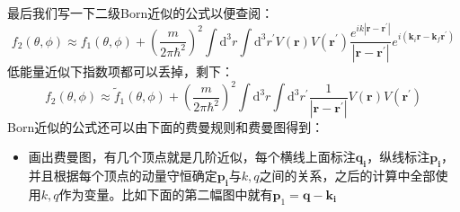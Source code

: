 \documentclass[a4paper,zihao=-4,linespread=1]{ctexrep}
\begin{document}
	最后我们写一下二级Born近似的公式以便查阅：
	\begin{equation}
		f_2(\theta,\phi)\approx f_1(\theta,\phi)+\left(\frac{m}{2\pi\hbar^2}\right)^2\int\mathrm{d}^3r\int\mathrm{d}^3r^\prime V(\mathbf{r})V(\mathbf{r^\prime})\frac{e^{ik|\mathbf{r}-\mathbf{r^\prime}|}}{|\mathbf{r}-\mathbf{r^\prime}|}e^{i\left(\mathbf{k}_i\mathbf{r}-\mathbf{k}_f\mathbf{r^\prime}\right)}
	\end{equation}
	低能量近似下指数项都可以丢掉，剩下：
	\begin{equation}
		f_2(\theta,\phi)\approx \tilde{f}_1(\theta,\phi)+\left(\frac{m}{2\pi\hbar^2}\right)^2\int\mathrm{d}^3r\int\mathrm{d}^3r^\prime \frac{1}{|\mathbf{r}-\mathbf{r^\prime}|}V(\mathbf{r})V(\mathbf{r^\prime})
	\end{equation}
	Born近似的公式还可以由下面的费曼规则和费曼图得到：
	\begin{itemize}
		\item 画出费曼图，有几个顶点就是几阶近似，每个横线上面标注$\mathbf{q_i}$，纵线标注$\mathbf{p_i}$，并且根据每个顶点的动量守恒确定$\mathbf{p_i}$与$k,q$之间的关系，之后的计算中全部使用$k,q$作为变量。比如下面的第二幅图中就有$\mathbf{p}_1=\mathbf{q}-\mathbf{k_i}$
		\begin{center}
			
			
			
			\begin{tikzpicture}[x=0.75pt,y=0.75pt,yscale=-1,xscale=1]
				

\end{tikzpicture}
\end{center}
\end{itemize}
\end{document}
